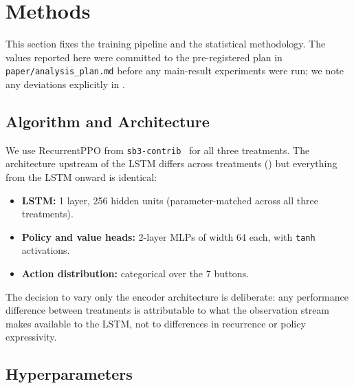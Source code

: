 \section{Methods}
\label{sec:methods}

This section fixes the training pipeline and the statistical
methodology.  The values reported here were committed to the
pre-registered plan in \texttt{paper/analysis\_plan.md} before any
main-result experiments were run; we note any deviations explicitly in
.

\subsection{Algorithm and Architecture}
\label{sec:algorithm}

We use RecurrentPPO from
\texttt{sb3-contrib}~\citep{sb3,schulman2017ppo,hausknecht2015drqn} for
all three treatments.  The architecture upstream of the LSTM differs
across treatments () but everything from the
LSTM onward is identical:
%
\begin{itemize}
\item \textbf{LSTM:} 1 layer, 256 hidden units (parameter-matched
  across all three treatments).
\item \textbf{Policy and value heads:} 2-layer MLPs of width 64 each,
  with \texttt{tanh} activations.
\item \textbf{Action distribution:} categorical over the 7 buttons.
\end{itemize}
%
The decision to vary only the encoder architecture is deliberate: any
performance difference between treatments is attributable to what the
observation stream makes available to the LSTM, not to differences in
recurrence or policy expressivity.

\subsection{Hyperparameters}
\label{sec:hyperparameters}

